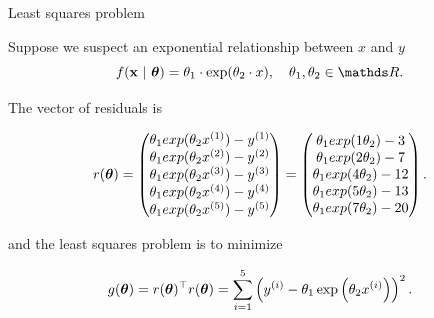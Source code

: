 \documentclass[11pt,compress,t,notes=noshow, xcolor=table]{beamer}
\begin{document}
\begin{vbframe}{Least squares problem}
\framebreak

Suppose we suspect an exponential relationship between $x$ and $y$ 
$$
\fxt = \theta_1 \cdot \exp(\theta_2 \cdot x), \quad \theta_1, \theta_2 \in \R.
$$





The vector of residuals is \begin{footnotesize}
$$
r(\bm{\theta}) = \begin{pmatrix} \theta_1 exp(\theta_2 x^{(1)}) - y^{(1)} \\\theta_1 exp(\theta_2 x^{(2)}) - y^{(2)}\\ \theta_1 exp(\theta_2 x^{(3)}) - y^{(3)} \\ \theta_1 exp(\theta_2 x^{(4)}) - y^{(4)} \\ \theta_1 exp(\theta_2 x^{(5)}) - y^{(5)}  \end{pmatrix} = \begin{pmatrix} 
\theta_1 exp(1 \theta_2) - 3 \\\theta_1 exp(2 \theta_2) - 7\\ \theta_1 exp(4 \theta_2) - 12 \\ \theta_1 exp(5 \theta_2) - 13 \\ \theta_1 exp(7 \theta_2) - 20
 \end{pmatrix}.
$$
\end{footnotesize}

and the least squares problem is to minimize

$$
g(\bm{\theta}) =  r(\bm{\theta})^\top r(\bm{\theta}) = \sum_{i=1}^{5} \left(y^{(i)} - \theta_1 \exp\left(\theta_2 x^{(i)}\right)\right)^2.
$$



\end{vbframe}
\end{document}
